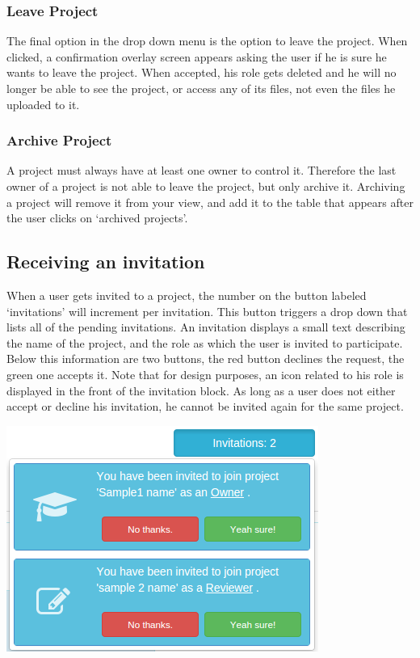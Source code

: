 \subsubsection{Leave Project}

The final option in the drop down menu is the option to leave the project. When clicked, a confirmation overlay screen appears asking the user
if he is sure he wants to leave the project. When accepted, his role gets deleted and he will no longer be able to see the project, or
access any of its files, not even the files he uploaded to it. 

\subsubsection{Archive Project}

A project must always have at least one owner to control it. Therefore the last owner of a project is not able to leave the project, but only
archive it. Archiving a project will remove it from your view, and add it to the table that appears after the user clicks on `archived projects'.

\subsection{Receiving an invitation}

When a user gets invited to a project, the number on the button labeled `invitations' will increment per invitation. This button triggers a drop down
that lists all of the pending invitations. An invitation displays a small text describing the name of the project, and the role as which the user is invited to participate. Below this information are two buttons, the red button declines the request, the green one accepts it.
Note that for design purposes, an icon related to his role is displayed in the front of the invitation block. 
As long as a user does not either accept or decline his invitation, he cannot be invited again for the same project.

\begin{center}
\includegraphics[scale=0.5]{./img/invitation.png}
\end{center}

